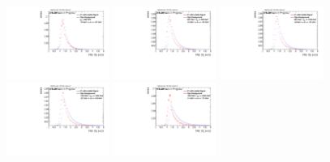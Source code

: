 \begin{figure}[H]
\bigskip
\includegraphics[width=0.3\textwidth]{sascha_input/Appendix/Distributions/higgs/distributions/beta05/h_assisted_tj_D2_05_bin1.pdf} \hspace{1mm}
\includegraphics[width=0.3\textwidth]{sascha_input/Appendix/Distributions/higgs/distributions/beta05/h_assisted_tj_D2_05_bin2.pdf} \hspace{4mm}
\includegraphics[width=0.3\textwidth]{sascha_input/Appendix/Distributions/higgs/distributions/beta05/h_assisted_tj_D2_05_bin3.pdf} 
\bigskip
\includegraphics[width=0.3\textwidth]{sascha_input/Appendix/Distributions/higgs/distributions/beta05/h_assisted_tj_D2_05_bin4.pdf} \hspace{4mm}
\includegraphics[width=0.3\textwidth]{sascha_input/Appendix/Distributions/higgs/distributions/beta05/h_assisted_tj_D2_05_bin5.pdf} 


\end{figure}
